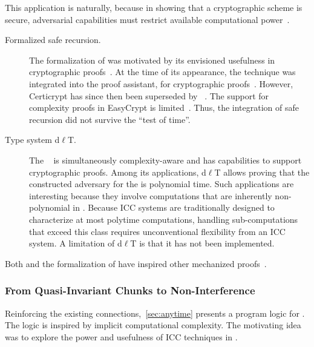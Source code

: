 This application is naturally, because in showing that a cryptographic scheme is secure, adversarial capabilities must restrict available computational power~\cite{heraud2011}.

\begin{description}

\item[Formalized safe recursion.]
The formalization of  was motivated by its envisioned
usefulness in cryptographic proofs~\cite{heraud2011}. At the
time of its appearance, the technique was integrated into the
\href{https://github.com/EasyCrypt/certicrypt} {} proof
assistant, for cryptographic proofs~\cite{barthe2009}. However, Certicrypt has
since then been superseded by ~\cite{barthe2014}. The support for
complexity proofs in EasyCrypt is limited~\cite{barbosa2023}. Thus, the
integration of safe recursion did not survive the \enquote{test of time}.

\item[Type system d\(\ell\)T.]
The  ~\cite{baillot2015,baillot2019} is
simultaneously complexity-aware and has capabilities to support cryptographic
proofs. Among its applications, d\(\ell\)T allows proving
that the constructed adversary for the  is
polynomial time. Such applications are interesting because they involve
computations that are inherently non-polynomial in .
Because ICC systems are traditionally designed to characterize at most polytime
computations, handling sub-computations that exceed this class requires
unconventional flexibility from an ICC system. A limitation of d\(\ell\)T is
that it has not been implemented.

\end{description}

Both  and the formalization of  have
inspired other mechanized proofs~\cite{barbosa2021,feree2018}.

\subsubsection{From Quasi-Invariant Chunks to Non-Interference}
\label{subsubsec:quasi-ni}

Reinforcing the existing connections,~\autoref{sec:anytime} presents a program
logic for . The logic is inspired by implicit
computational complexity. The motivating idea was to explore the power and
usefulness of ICC techniques in .

